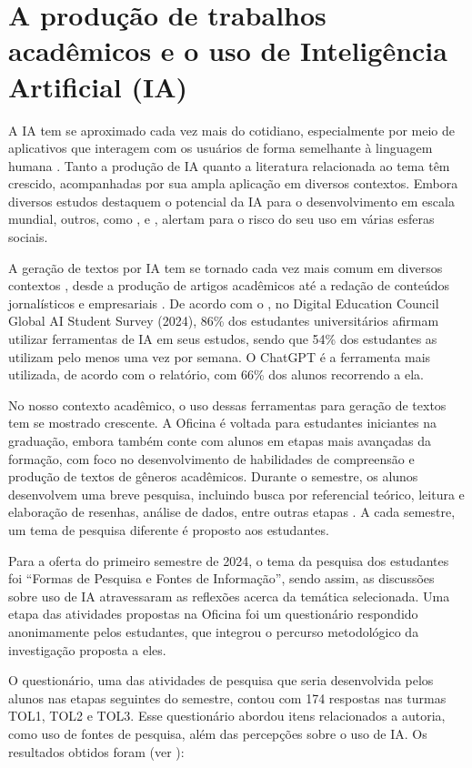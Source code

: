\documentclass[portuguese]{textolivre}
\begin{document}
\section{A produção de trabalhos acadêmicos e o uso de Inteligência Artificial (IA)}\label{sec-2}
A IA tem se aproximado cada vez mais do cotidiano, especialmente por meio de aplicativos que interagem com os usuários de forma semelhante à linguagem humana \cite{rodrigues2023, carvalho2021}. Tanto a produção de IA quanto a literatura relacionada ao tema têm crescido, acompanhadas por sua ampla aplicação em diversos contextos. Embora diversos estudos destaquem o potencial da IA para o desenvolvimento em escala mundial, outros, como \textcite{cortiz2024}, \textcite{almeida2024} e \textcite{carvalho2021}, alertam para o risco do seu uso em várias esferas sociais.

A geração de textos por IA tem se tornado cada vez mais comum em diversos contextos \cite{carvalho2021}, desde a produção de artigos acadêmicos até a redação de conteúdos jornalísticos e empresariais \cite{rodrigues2023}. De acordo com o  \textcite{digital2024}, no Digital Education Council Global AI Student Survey (2024), 86\% dos estudantes universitários afirmam utilizar ferramentas de IA em seus estudos, sendo que 54\% dos estudantes as utilizam pelo menos uma vez por semana. O ChatGPT é a ferramenta mais utilizada, de acordo com o relatório, com 66\% dos alunos recorrendo a ela.

No nosso contexto acadêmico, o uso dessas ferramentas para geração de textos tem se mostrado crescente. A Oficina é voltada para estudantes iniciantes na graduação, embora também conte com alunos em etapas mais avançadas da formação, com foco no desenvolvimento de habilidades de compreensão e produção de textos de gêneros acadêmicos. Durante o semestre, os alunos desenvolvem uma breve pesquisa, incluindo busca por referencial teórico, leitura e elaboração de resenhas, análise de dados, entre outras etapas \cite{coscarelli2017}. A cada semestre, um tema de pesquisa diferente é proposto aos estudantes.

Para a oferta do primeiro semestre de 2024, o tema da pesquisa dos estudantes foi ``Formas de Pesquisa e Fontes de Informação'', sendo assim, as discussões sobre uso de IA atravessaram as reflexões acerca da temática selecionada. Uma etapa das atividades propostas na Oficina foi um questionário respondido anonimamente pelos estudantes, que integrou o percurso metodológico da investigação proposta a eles.

O questionário, uma das atividades de pesquisa que seria desenvolvida pelos alunos nas etapas seguintes do semestre, contou com 174 respostas nas turmas TOL1, TOL2 e TOL3. Esse questionário abordou itens relacionados a autoria, como uso de fontes de pesquisa, além das percepções sobre o uso de IA. Os resultados obtidos foram (ver ):
\end{document}
